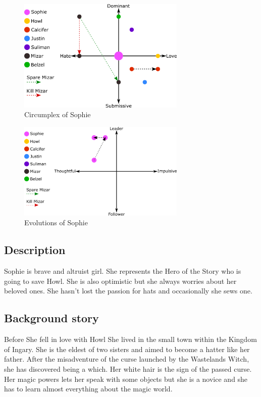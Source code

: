 \begin{figure}[H]
  \centering
  \includegraphics[width=8cm]{Images/SVG/Exported/Circumplexes/sophieCircumplex}
  \caption{Circumplex of Sophie}
\end{figure}

\begin{figure}[H]
  \centering
  \includegraphics[width=8cm]{Images/SVG/Exported/Evolutions/sophieEvolution}
  \caption{Evolutions of Sophie}
\end{figure}

\subsection{Description}
Sophie is brave and altruist girl. She represents the Hero of the Story who is going to save Howl. She is also optimistic but she always worries about her beloved ones. She hasn’t lost the passion for hats and occasionally she sews one.

\subsection{Background story}
Before She fell in love with Howl She lived in the small town within the Kingdom of Ingary. She is the eldest of two sisters and aimed to become a hatter like her father. After the misadventure of the curse launched by the Wastelands Witch, she has discovered being a which. Her white hair is the sign of the passed curse. Her magic powers lets her speak with some objects but she is a novice and she has to learn almost everything about the magic world.
